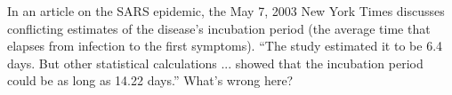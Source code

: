  In an article on the SARS epidemic, the May 7, 2003 New
York Times discusses conflicting estimates of the disease's
incubation period (the average time that elapses from
infection to the first symptoms). ``The study estimated it
to be 6.4 days. But other statistical calculations ...
showed that the incubation period could be as long as 14.22
days.'' What's wrong here?
